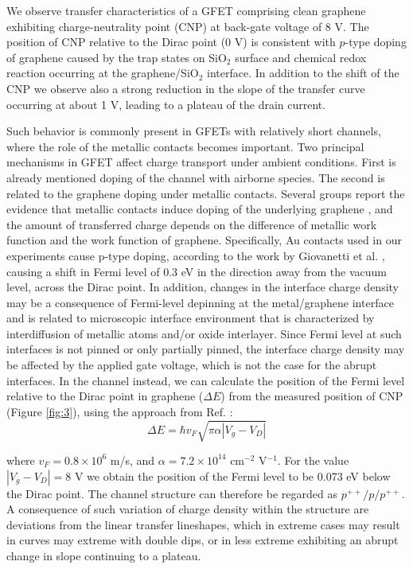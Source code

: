 \documentclass[preprint,aip,jap]{revtex4-2}
\begin{document}
We observe transfer characteristics of a GFET comprising clean graphene exhibiting charge-neutrality point (CNP) at back-gate voltage of 8 V.
  The position of CNP relative to the Dirac point (0 V) is consistent with $p$-type doping of graphene caused by the trap states on SiO$_{2}$ surface and chemical redox reaction occurring at the graphene/SiO$_{2}$ interface\cite{feng-2014,peng-2017,lafkioti-2010}.
  In addition to the shift of the CNP we observe also a strong reduction in the slope of the transfer curve occurring at about 1 V, leading to a plateau of the drain current.

  Such behavior is commonly present in GFETs with relatively short channels, where the role of the metallic contacts becomes important\cite{bartolomeo-2015,nouchi-2008,nouchi-2014}.
 Two principal mechanisms in GFET affect charge transport under ambient conditions.
 First is already mentioned doping of the channel with airborne species.
 The second is related to the graphene doping under metallic contacts\cite{farmer-2009,giovannetti-2008,lee-2008,mueller-2009}.
  Several groups report the evidence that metallic contacts induce doping of the underlying graphene \cite{giovannetti-2008,mueller-2009,huard-2008}, and the amount of transferred charge depends on the difference of metallic work function and the work function of graphene.
  Specifically, Au contacts used in our experiments cause p-type doping, according to the work by Giovanetti et al.
\cite{giovannetti-2008}, causing a shift in Fermi level of 0.3 eV in the direction away from the vacuum level, across the Dirac point.
 In addition, changes in the interface charge density may be a consequence of Fermi-level depinning at the metal/graphene interface and is related to microscopic interface environment that is characterized by interdiffusion of metallic atoms and/or oxide interlayer\cite{nouchi-2008,nouchi-2014}.
 Since Fermi level at such interfaces is not pinned or only partially pinned\cite{dibartolomeo-2011}, the interface charge density may be affected by the applied gate voltage, which is not the case for the abrupt interfaces.
  In the channel instead, we can calculate the position of the Fermi level relative to the Dirac point in graphene ($\Delta E$) from the measured position of CNP (Figure \ref{fig:3}), using the approach from Ref.
 :
\begin{equation}
  \label{eq:1}
  \Delta E = \hbar v_{F}\sqrt{\pi\alpha|V_{g}-V_{D}|}
\end{equation}

where $v_F=0.
8\times10^6$ m/s, and $\alpha=7.
2\times10^{14}$ cm$^{-2}$ V$^{-1}$.
 For the value $|V_g-V_D |=8$ V we obtain the position of the Fermi level to be 0.073 eV below the Dirac point.
 The channel structure can therefore be regarded as $p^{++}/p/p^{++}$.
 A consequence of such variation of charge density within the structure are deviations from the linear transfer lineshapes, which in extreme cases may result in curves may extreme with double dips\cite{nouchi-2014,nam-2012}, or in less extreme exhibiting an abrupt change in slope continuing to a plateau.
 
\end{document}
